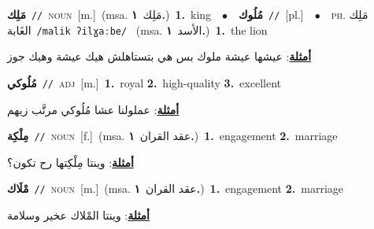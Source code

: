 \documentclass[10pt,a4paper,twoside]{article} %
\begin{document}
\begin{multicols}{2}
{\setlength\topsep{0pt}\textbf{\foreignlanguage{arabic}{مَلِك}}\ {\color{gray}\texttt{//}\color{black}}\ \textsc{noun}\ [m.]\ \color{gray}(msa. \foreignlanguage{arabic}{مَلِك}~\foreignlanguage{arabic}{\textbf{١.}})\color{black}\ \textbf{1.}~king\ \ $\bullet$\ \ \setlength\topsep{0pt}\textbf{\foreignlanguage{arabic}{مُلُوك}}\ {\color{gray}\texttt{//}\color{black}}\ [pl.]\ \ $\bullet$\ \ \textsc{ph.} \color{gray} \foreignlanguage{arabic}{مَلِك الغَابة}\color{black}\ {\color{gray}\texttt{/{\sffamily malik ʔilɣaːbe}/}\color{black}}\ \color{gray} (msa. \foreignlanguage{arabic}{الأسد}~\foreignlanguage{arabic}{\textbf{١.}})\color{black}\ \textbf{1.}~the lion\  \begin{flushright}\color{gray}\foreignlanguage{arabic}{\textbf{\underline{\foreignlanguage{arabic}{أمثلة}}}: عيشها عيشة ملوك بس هي بتستاهلش هيك عيشة وهيك جوز}\end{flushright}\color{black}} \vspace{2mm}

{\setlength\topsep{0pt}\textbf{\foreignlanguage{arabic}{مُلُوكي}}\ {\color{gray}\texttt{//}\color{black}}\ \textsc{adj}\ [m.]\ \textbf{1.}~royal  \textbf{2.}~high-quality  \textbf{3.}~excellent\  \begin{flushright}\color{gray}\foreignlanguage{arabic}{\textbf{\underline{\foreignlanguage{arabic}{أمثلة}}}: عملولنا عشا مُلُوكي مرتَّب زيهم}\end{flushright}\color{black}} \vspace{2mm}

{\setlength\topsep{0pt}\textbf{\foreignlanguage{arabic}{مِلْكِة}}\ {\color{gray}\texttt{//}\color{black}}\ \textsc{noun}\ [f.]\ \color{gray}(msa. \foreignlanguage{arabic}{عقد القران}~\foreignlanguage{arabic}{\textbf{١.}})\color{black}\ \textbf{1.}~engagement  \textbf{2.}~marriage\  \begin{flushright}\color{gray}\foreignlanguage{arabic}{\textbf{\underline{\foreignlanguage{arabic}{أمثلة}}}: وينتا مِلْكِتها رح تكون؟}\end{flushright}\color{black}} \vspace{2mm}

{\setlength\topsep{0pt}\textbf{\foreignlanguage{arabic}{مْلَاك}}\ {\color{gray}\texttt{//}\color{black}}\ \textsc{noun}\ [m.]\ \color{gray}(msa. \foreignlanguage{arabic}{عقد القران}~\foreignlanguage{arabic}{\textbf{١.}})\color{black}\ \textbf{1.}~engagement  \textbf{2.}~marriage\  \begin{flushright}\color{gray}\foreignlanguage{arabic}{\textbf{\underline{\foreignlanguage{arabic}{أمثلة}}}: وينتا المْلاك  عخير وسلامة}\end{flushright}\color{black}} \vspace{2mm}


\end{multicols}
\end{document}
